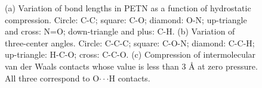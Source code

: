 \documentclass[prb,aps,nobibnotes,twocolumn,doublespace,twocolumngrid,superbib]{revtex4}
\begin{document}
\begin{figure}
\caption{(a) Variation of bond lengths in PETN as a function of hydrostatic 
compression.  Circle: C-C; square: C-O; diamond: O-N; up-triangle and
cross: N=O; down-triangle and plus: C-H.  (b) Variation of
three-center angles. Circle: C-C-C; square: C-O-N; diamond: C-C-H;
up-triangle: H-C-O; cross: C-C-O. (c) Compression of intermolecular
van der Waals 
contacts whose value is less than 3 \AA\/ at zero pressure.  All three
correspond to O$\cdot\cdot\cdot$H contacts.}
\label{fig:intramolecular}
\end{figure}
\end{document}
